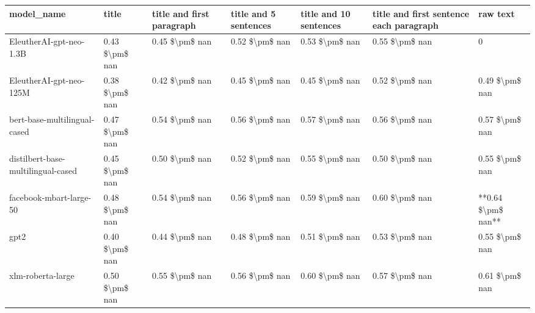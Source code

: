 \begin{tabular}{lllllll}
\toprule
                        model\_name &          title & title and first paragraph & title and 5 sentences & title and 10 sentences & title and first sentence each paragraph &           raw text \\
\midrule
           EleutherAI-gpt-neo-1.3B & 0.43 \$\textbackslash pm\$ nan &            0.45 \$\textbackslash pm\$ nan &        0.52 \$\textbackslash pm\$ nan &         0.53 \$\textbackslash pm\$ nan &                          0.55 \$\textbackslash pm\$ nan &                  0 \\
           EleutherAI-gpt-neo-125M & 0.38 \$\textbackslash pm\$ nan &            0.42 \$\textbackslash pm\$ nan &        0.45 \$\textbackslash pm\$ nan &         0.45 \$\textbackslash pm\$ nan &                          0.52 \$\textbackslash pm\$ nan &     0.49 \$\textbackslash pm\$ nan \\
      bert-base-multilingual-cased & 0.47 \$\textbackslash pm\$ nan &            0.54 \$\textbackslash pm\$ nan &        0.56 \$\textbackslash pm\$ nan &         0.57 \$\textbackslash pm\$ nan &                          0.56 \$\textbackslash pm\$ nan &     0.57 \$\textbackslash pm\$ nan \\
distilbert-base-multilingual-cased & 0.45 \$\textbackslash pm\$ nan &            0.50 \$\textbackslash pm\$ nan &        0.52 \$\textbackslash pm\$ nan &         0.55 \$\textbackslash pm\$ nan &                          0.50 \$\textbackslash pm\$ nan &     0.55 \$\textbackslash pm\$ nan \\
           facebook-mbart-large-50 & 0.48 \$\textbackslash pm\$ nan &            0.54 \$\textbackslash pm\$ nan &        0.56 \$\textbackslash pm\$ nan &         0.59 \$\textbackslash pm\$ nan &                          0.60 \$\textbackslash pm\$ nan & **0.64 \$\textbackslash pm\$ nan** \\
                              gpt2 & 0.40 \$\textbackslash pm\$ nan &            0.44 \$\textbackslash pm\$ nan &        0.48 \$\textbackslash pm\$ nan &         0.51 \$\textbackslash pm\$ nan &                          0.53 \$\textbackslash pm\$ nan &     0.55 \$\textbackslash pm\$ nan \\
                 xlm-roberta-large & 0.50 \$\textbackslash pm\$ nan &            0.55 \$\textbackslash pm\$ nan &        0.56 \$\textbackslash pm\$ nan &         0.60 \$\textbackslash pm\$ nan &                          0.57 \$\textbackslash pm\$ nan &     0.61 \$\textbackslash pm\$ nan \\
\bottomrule
\end{tabular}
